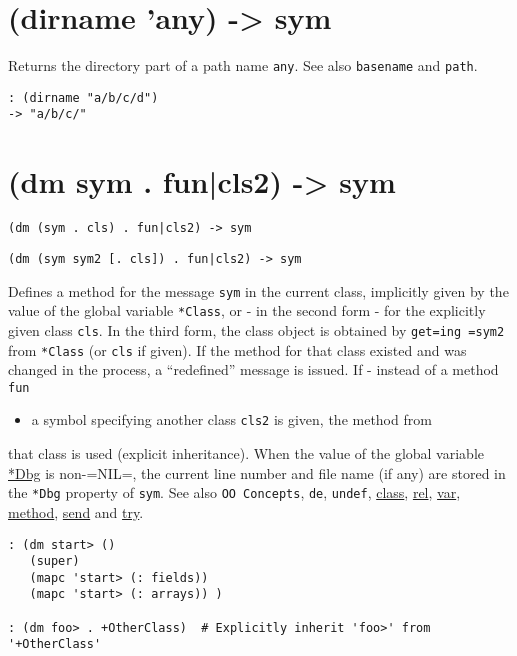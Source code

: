 {{{ 
\section{(dirname 'any) -> sym}
\label{sec-8-1-4-34}


Returns the directory part of a path name \texttt{any}. See also \texttt{basename} and
\texttt{path}.


\begin{verbatim}
: (dirname "a/b/c/d")
-> "a/b/c/"
\end{verbatim}

 
\section{(dm sym . fun|cls2) -> sym}
\label{sec-8-1-4-35}


\texttt{(dm (sym . cls) . fun|cls2) -> sym}

\texttt{(dm (sym sym2 [. cls]) . fun|cls2) -> sym}

Defines a method for the message \texttt{sym} in the current class, implicitly
given by the value of the global variable \texttt{*Class}, or - in the second
form - for the explicitly given class \texttt{cls}. In the third form, the
class object is obtained by \texttt{get=ing =sym2} from \texttt{*Class} (or \texttt{cls} if
given). If the method for that class existed and was changed in the
process, a ``redefined'' message is issued. If - instead of a method \texttt{fun}
\begin{itemize}
\item a symbol specifying another class \texttt{cls2} is given, the method from
\end{itemize}
that class is used (explicit inheritance). When the value of the global
variable \hyperref[refD.html-Dbg]{*Dbg} is non-=NIL=, the current line number
and file name (if any) are stored in the \texttt{*Dbg} property of \texttt{sym}. See
also \texttt{OO Concepts}, \texttt{de}, \texttt{undef}, \hyperref[refC.html-class]{class},
\hyperref[refR.html-rel]{rel}, \hyperref[refV.html-var]{var},
\hyperref[refM.html-method]{method}, \hyperref[refS.html-send]{send} and
\hyperref[refT.html-try]{try}.


\begin{verbatim}
: (dm start> ()
   (super)
   (mapc 'start> (: fields))
   (mapc 'start> (: arrays)) )

: (dm foo> . +OtherClass)  # Explicitly inherit 'foo>' from '+OtherClass'
\end{verbatim}

}}}
